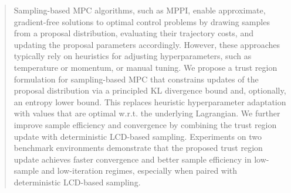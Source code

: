 
\begin{abstract}
Sampling-based \ac{MPC} algorithms, such as \ac{MPPI}, enable approximate, gradient-free solutions to optimal control problems by drawing samples from a proposal distribution, evaluating their trajectory costs, and updating the proposal parameters accordingly.
However, these approaches typically rely on heuristics for adjusting hyperparameters, such as temperature or momentum, or manual tuning.
We propose a trust region formulation for sampling-based \ac{MPC} that constrains updates of the proposal distribution via a principled \ac{KL} divergence bound and, optionally, an entropy lower bound.
This replaces heuristic hyperparameter adaptation with values that are optimal w.r.t. the underlying Lagrangian. 
We further improve sample efficiency and convergence by combining the trust region update with deterministic \ac{LCD}-based sampling.
Experiments on two benchmark environments demonstrate that the proposed trust region update achieves faster convergence and better sample efficiency in low-sample and low-iteration regimes, especially when paired with deterministic \ac{LCD}-based sampling.
\acresetall
\end{abstract}